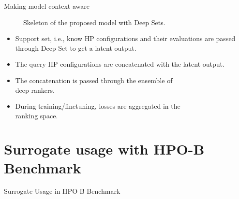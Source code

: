 \documentclass{beamer}
\begin{document}
\begin{frame}[t]{Making model context aware}
\begin{figure}[htb]
\begin{tikzpicture}
\end{tikzpicture}
\caption{Skeleton of the proposed model with Deep Sets.}
\label{fig:proposeModelDeepSets}
\end{figure}

\begin{itemize}
\item Support set, i.e., know HP configurations and their evaluations are passed through Deep Set to get a latent output.
\item The query HP configurations are concatenated with the latent output.
\item The concatenation is passed through the ensemble of \\
deep rankers.
\item During training/finetuning, losses are aggregated in the\\
 ranking space.
\end{itemize}

\end{frame}

\section{Surrogate usage with HPO-B Benchmark}
\begin{frame}

\centering
\LARGE{Surrogate Usage in HPO-B Benchmark}

\end{frame}
\end{document}
